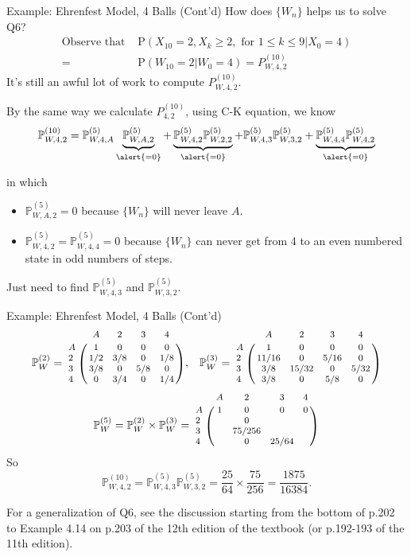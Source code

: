 \documentclass[letterpaper, mathserif, handout]{beamer}
\def\P{\mathbb{P}}
\def\p{\mathrm P}
\begin{document}
\begin{frame}{Example: Ehrenfest Model, 4 Balls (Cont'd)}
How does $\{W_n\}$ helps us to solve Q6?
\begin{align*}
\text{Observe that }&\p(X_{10}=2, X_k\ge 2, \text{ for }1\le k\le 9|X_0=4)\\
=\,&\p(W_{10}=2|W_0=4)=P^{(10)}_{W,4,2}
\end{align*}
It's still an awful lot of work to compute $P^{(10)}_{W,4,2}$.

By the same way we calculate $P^{(10)}_{4,2}$, using C-K equation, we know
\[
\P^{(10)}_{W,4,2}=
\P^{(5)}_{W,4,A}\underbrace{\P^{(5)}_{W,A,2}}_{\alert{=0}}+
\underbrace{\P^{(5)}_{W,4,2}\P^{(5)}_{W,2,2}}_{\alert{=0}}+
\P^{(5)}_{W,4,3}\P^{(5)}_{W,3,2}+
\underbrace{\P^{(5)}_{W,4,4}\P^{(5)}_{W,4,2}}_{\alert{=0}}
\]

\vspace{-12pt}in which
\begin{itemize}
\item $\P^{(5)}_{W,A,2}=0$ because $\{W_n\}$ will never leave $A.$
\item $\P^{(5)}_{W,4,2}=\P^{(5)}_{W,4,4}=0$  because $\{W_n\}$ can never get from 4 to an even numbered state in odd numbers of steps.
\end{itemize}
Just need to find $\P^{(5)}_{W,4,3}$ and $\P^{(5)}_{W,3,2}.$
\end{frame}
\begin{frame}{Example: Ehrenfest Model, 4 Balls (Cont'd)}
\[{\footnotesize\P_W^{(2)}=
\bordermatrix{%
  &  A  &  2  &  3  &  4 \cr
A &  1  &  0  &  0  &  0 \cr
2 & 1/2 & 3/8 &  0  &1/8\cr
3 & 3/8 &  0  & 5/8&  0 \cr
4 &  0  & 3/4 &  0  &1/4
},\quad
\P_W^{(3)}=
\bordermatrix{%
  &  A  &  2  &  3  &  4 \cr
A &  1  &  0  &  0  &  0 \cr
2 &11/16&  0  & 5/16&  0 \cr
3 & 3/8 &15/32&  0  &5/32\cr
4 & 3/8 &  0  & 5/8 &  0
}
}\]
\[
\P_W^{(5)}=\P_W^{(2)}\times \P_W^{(3)}
={\footnotesize
\bordermatrix{%
  &  A  &  2  &  3  &  4 \cr
A &  1  &  0  &  0  &  0 \cr
2 &     &  0  &     &    \cr
3 &     &75/256&    &    \cr
4 &     &  0  &25/64&
}}
\]
So
\[
\P^{(10)}_{W,4,2}=\P^{(5)}_{W,4,3}\P^{(5)}_{W,3,2}
= \frac{25}{64}\times\frac{75}{256}=\frac{1875}{16384}.
\]
\end{frame}
\begin{frame}
For a generalization of Q6,
see the discussion starting from the bottom of p.202 to Example 4.14 on p.203 of
the 12th edition of the textbook (or p.192-193 of the 11th edition).

\end{frame}
\end{document}
